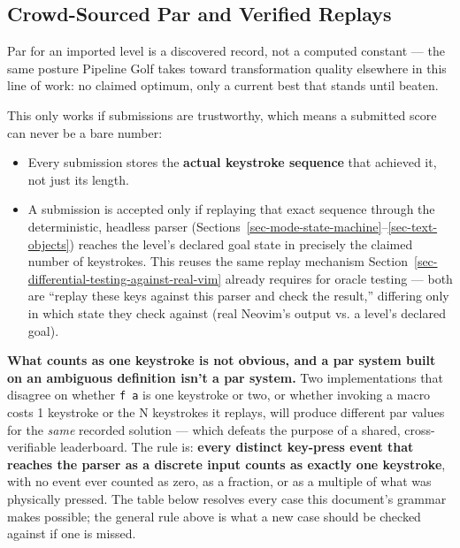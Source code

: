 \documentclass[11pt]{article}
\providecommand{\tightlist}{%
  \setlength{\itemsep}{0pt}\setlength{\parskip}{0pt}}
\begin{document}
\hypertarget{sec-crowd-sourced-par-and-verified-replays}{%
\subsection{Crowd-Sourced Par and Verified Replays}\label{sec-crowd-sourced-par-and-verified-replays}}

Par for an imported level is a discovered record, not a computed constant ---
the same posture Pipeline Golf takes toward transformation quality elsewhere
in this line of work: no claimed optimum, only a current best that stands
until beaten.

This only works if submissions are trustworthy, which means a submitted
score can never be a bare number:

\begin{itemize}
\tightlist
\item
  Every submission stores the \textbf{actual keystroke sequence} that achieved
  it, not just its length.
\item
  A submission is accepted only if replaying that exact sequence through the
  deterministic, headless parser (Sections~\ref{sec-mode-state-machine}--\ref{sec-text-objects}) reaches the level's declared
  goal state in precisely the claimed number of keystrokes. This reuses the
  same replay mechanism Section~\ref{sec-differential-testing-against-real-vim} already requires for oracle testing ---
  both are ``replay these keys against this parser and check the result,''
  differing only in which state they check against (real Neovim's output vs.
  a level's declared goal).
\end{itemize}

\textbf{What counts as one keystroke is not obvious, and a par system built on an
ambiguous definition isn't a par system.} Two implementations that
disagree on whether \texttt{f\ a} is one keystroke or two, or whether invoking a
macro costs 1 keystroke or the N keystrokes it replays, will produce
different par values for the \emph{same} recorded solution --- which defeats the
purpose of a shared, cross-verifiable leaderboard. The rule is: \textbf{every
distinct key-press event that reaches the parser as a discrete input counts
as exactly one keystroke}, with no event ever counted as zero, as a
fraction, or as a multiple of what was physically pressed. The table below
resolves every case this document's grammar makes possible; the general
rule above is what a new case should be checked against if one is missed.
\end{document}

